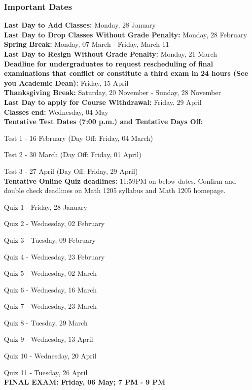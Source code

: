 \documentclass{article}
\begin{document}
			
		 
			\subsubsection*{Important Dates} 
				\textbf{Last Day to Add Classes:} Monday, 28 January \\
				\textbf{Last Day to Drop Classes Without Grade Penalty:} Monday, 28
				February \\
				\textbf{Spring Break:} Monday, 07 March - Friday, March 11 \\
				\textbf{Last Day to Resign Without Grade Penalty:} Monday, 21 March \\
				\textbf{Deadline for undergraduates to request rescheduling of final
				examinations that conflict or constitute a third exam in 24 hours (See
				you Academic Dean):} Friday, 15 April \\
				\textbf{Thanksgiving Break:} Saturday, 20 November - Sunday, 28 November \\
				\textbf{Last Day to apply for Course Withdrawal:} Friday, 29 April \\ 
				\textbf{Classes end:} Wednesday, 04 May \\
				\textbf{Tentative Test Dates (7:00 p.m.) and Tentative Days Off:}
					\par  Test 1 - 16 February (Day Off: Friday, 04 March) 
					\par  Test 2 - 30 March (Day Off: Friday, 01 April) 
					\par  Test 3 - 27 April (Day Off: Friday, 29 April) \\
				\textbf{Tentative Online Quiz deadlines:} 11:59PM on below dates.
				Confirm and double check deadlines on Math 1205 syllabus and Math 1205
				homepage.  
					\par  Quiz 1 - Friday, 28 January
					\par  Quiz 2 - Wednesday, 02 February
					\par  Quiz 3 - Tuesday, 09 February
					\par  Quiz 4 - Wednesday, 23 February
					\par  Quiz 5 - Wednesday, 02 March
					\par  Quiz 6 - Wednesday, 16 March
					\par  Quiz 7 - Wednesday, 23 March
					\par  Quiz 8 - Tuesday, 29 March
					\par  Quiz 9 - Wednesday, 13 April
					\par  Quiz 10 - Wednesday, 20 April
					\par  Quiz 11 - Tuesday, 26 April \\
				\textbf{FINAL EXAM: Friday, 06 May; 7 PM - 9 PM} 
		
\end{document}

